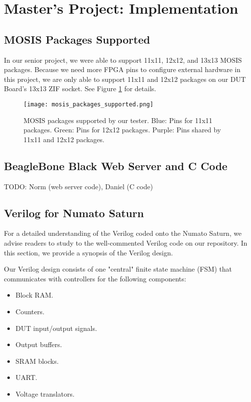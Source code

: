 \section{Master's Project: Implementation}

\subsection{MOSIS Packages Supported}
In our senior project, we were able to support 11x11, 12x12, and 13x13 MOSIS packages. Because we need more FPGA pins to configure external hardware in this project, we are only able to support 11x11 and 12x12 packages on our DUT Board's 13x13 ZIF socket. See Figure \ref{fig:mosis_packages_supported} for details.

\begin{figure}
\texttt{[image: mosis\_packages\_supported.png]}
\caption{MOSIS packages supported by our tester. Blue: Pins for 11x11 packages. Green: Pins for 12x12 packages. Purple: Pins shared by 11x11 and 12x12 packages.}
\label{fig:mosis_packages_supported}
\end{figure}

\subsection{BeagleBone Black Web Server and C Code}
TODO: Norm (web server code), Daniel (C code)
\subsection{Verilog for Numato Saturn}
For a detailed understanding of the Verilog coded onto the Numato Saturn, we advise readers to study to the well-commented Verilog code on our repository. In this section, we provide a synopsis of the Verilog design.

Our Verilog design consists of one "central" finite state machine (FSM) that communicates with controllers for the following components: 
\begin{itemize}
	\item Block RAM.
	\item Counters.
	\item DUT input/output signals.
	\item Output buffers.
	\item SRAM blocks.
	\item UART.
	\item Voltage translators.
\end{itemize}

